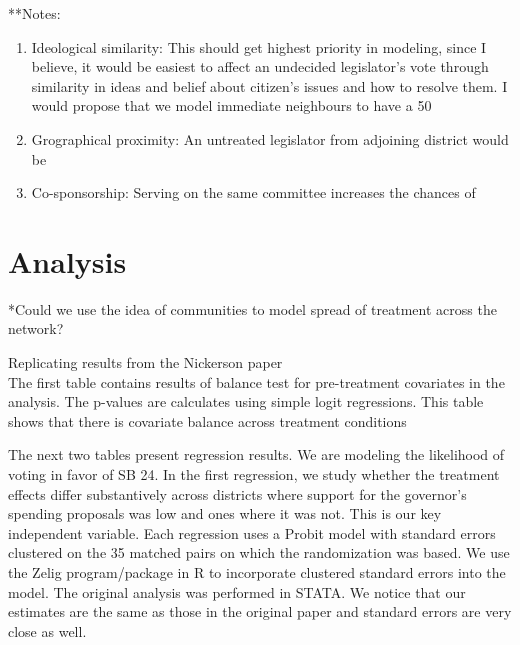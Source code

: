 \documentclass[12pt]{article}
\begin{document}
**Notes:
\begin{enumerate}

\item Ideological similarity: This should get highest priority in modeling, since I believe, it would be easiest to affect an undecided legislator's vote through similarity in ideas and belief about citizen's issues and how to resolve them. I would propose that we model immediate neighbours to have a 50%
\item Grographical proximity: An untreated legislator from adjoining district would be 
\item Co-sponsorship: Serving on the same committee increases the chances of 

\end{enumerate}



\section{Analysis}

*Could we use the idea of communities to model spread of treatment across the network?


Replicating results from the Nickerson paper \\


The first table contains results of balance test for pre-treatment covariates in the analysis. The p-values are calculates using simple logit regressions. This table shows that there is covariate balance across treatment conditions




The next two tables present regression results. We are modeling the likelihood of voting in favor of SB 24. In the first regression, we study whether the treatment effects differ substantively across districts where support for the governor's spending proposals was low and ones where it was not. This is our key independent variable. Each regression uses a Probit model with standard errors clustered on the 35 matched pairs on which the randomization was based. We use the Zelig program/package in R to incorporate clustered standard errors into the model. The original analysis was performed in STATA. We notice that our estimates are the same as those in the original paper and standard errors are very close as well.


\end{document}
